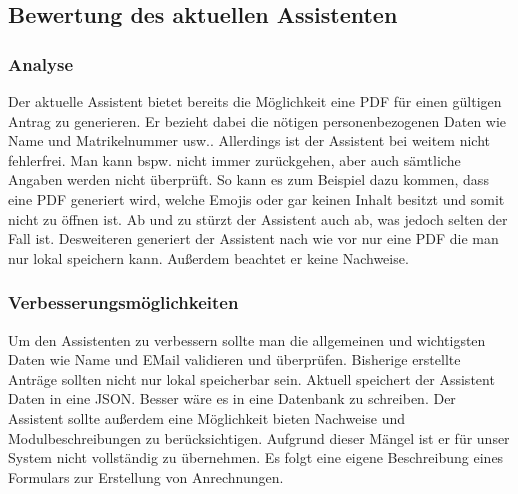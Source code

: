 \subsection{Bewertung des aktuellen Assistenten}

\subsubsection{Analyse}
Der aktuelle Assistent bietet bereits die Möglichkeit eine PDF für einen gültigen Antrag zu generieren. Er bezieht dabei die nötigen personenbezogenen Daten wie Name und Matrikelnummer usw.. Allerdings ist der Assistent bei weitem nicht fehlerfrei. Man kann bspw. nicht immer zurückgehen, aber auch sämtliche Angaben werden nicht überprüft. So kann es zum Beispiel dazu kommen, dass eine PDF generiert wird, welche Emojis oder gar keinen Inhalt besitzt und somit nicht zu öffnen ist. Ab und zu stürzt der Assistent auch ab, was jedoch selten der Fall ist.
Desweiteren generiert der Assistent nach wie vor nur eine PDF die man nur lokal speichern kann. Außerdem beachtet er keine Nachweise.

\subsubsection{Verbesserungsmöglichkeiten}
Um den Assistenten zu verbessern sollte man die allgemeinen und wichtigsten Daten wie Name und EMail validieren und überprüfen. Bisherige erstellte Anträge sollten nicht nur lokal speicherbar sein. Aktuell speichert der Assistent Daten in eine JSON. Besser wäre es in eine Datenbank zu schreiben. Der Assistent sollte außerdem eine Möglichkeit bieten Nachweise und Modulbeschreibungen zu berücksichtigen.
Aufgrund dieser Mängel ist er für unser System nicht vollständig zu übernehmen. Es folgt eine eigene Beschreibung eines Formulars zur Erstellung von Anrechnungen.


